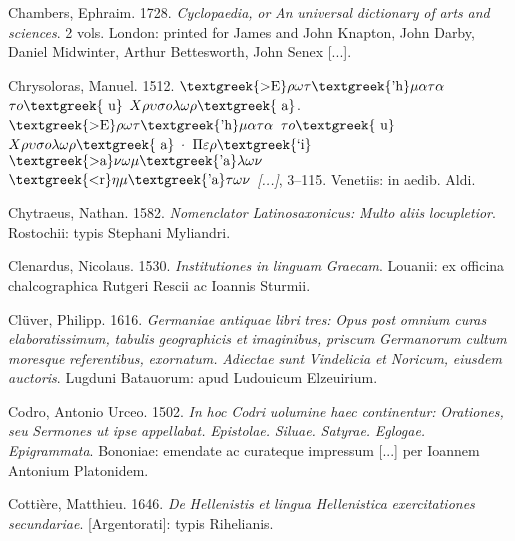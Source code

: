 Chambers, Ephraim. 1728. \textit{Cyclopaedia,} \textit{or} \textit{An} \textit{universal} \textit{dictionary} \textit{of} \textit{arts} \textit{and} \textit{sciences}. 2 vols. London: printed for James and John Knapton, John Darby, Daniel Midwinter, Arthur Bettesworth, John Senex [...].

Chrysoloras, Manuel. 1512. $\text{\textgreek{>E}}\rho \omega \tau \text{\textgreek{'h}}\mu \alpha \tau \alpha $ $\tau o\text{\textgreek{~u}}$ $X\rho \upsilon \sigma o\lambda \omega \rho \text{\textgreek{~a}}$. \textit{$\text{\textgreek{>E}}\rho \omega \tau \text{\textgreek{'h}}\mu \alpha \tau \alpha $ $\tau o\text{\textgreek{~u}}$ $X\rho \upsilon \sigma o\lambda \omega \rho \text{\textgreek{~a}}$· $\Pi \varepsilon \rho \text{\textgreek{`i}}$ $\text{\textgreek{>a}}\nu \omega \mu \text{\textgreek{'a}}\lambda \omega \nu $ $\text{\textgreek{<r}}\eta \mu \text{\textgreek{'a}}\tau \omega \nu $ [...]}, 3–115. Venetiis: in aedib. Aldi.

Chytraeus, Nathan. 1582. \textit{Nomenclator} \textit{Latinosaxonicus:} \textit{Multo} \textit{aliis} \textit{locupletior}. Rostochii: typis Stephani Myliandri.

Clenardus, Nicolaus. 1530. \textit{Institutiones} \textit{in} \textit{linguam} \textit{Graecam}. Louanii: ex officina chalcographica Rutgeri Rescii ac Ioannis Sturmii.

Clüver, Philipp. 1616. \textit{Germaniae} \textit{antiquae} \textit{libri} \textit{tres:} \textit{Opus} \textit{post} \textit{omnium} \textit{curas} \textit{elaboratissimum,} \textit{tabulis} \textit{geographicis} \textit{et} \textit{imaginibus,} \textit{priscum} \textit{Germanorum} \textit{cultum} \textit{moresque} \textit{referentibus,} \textit{exornatum.} \textit{Adiectae} \textit{sunt} \textit{Vindelicia} \textit{et} \textit{Noricum,} \textit{eiusdem} \textit{auctoris}. Lugduni Batauorum: apud Ludouicum Elzeuirium.

Codro, Antonio Urceo. 1502. \textit{In} \textit{hoc} \textit{Codri} \textit{uolumine} \textit{haec} \textit{continentur:} \textit{Orationes,} \textit{seu} \textit{Sermones} \textit{ut} \textit{ipse} \textit{appellabat.} \textit{Epistolae.} \textit{Siluae.} \textit{Satyrae.} \textit{Eglogae.} \textit{Epigrammata}. Bononiae: emendate ac curateque impressum [...] per Ioannem Antonium Platonidem.

Cottière, Matthieu. 1646. \textit{De} \textit{Hellenistis} \textit{et} \textit{lingua} \textit{Hellenistica} \textit{exercitationes} \textit{secundariae}. [Argentorati]: typis Rihelianis.

